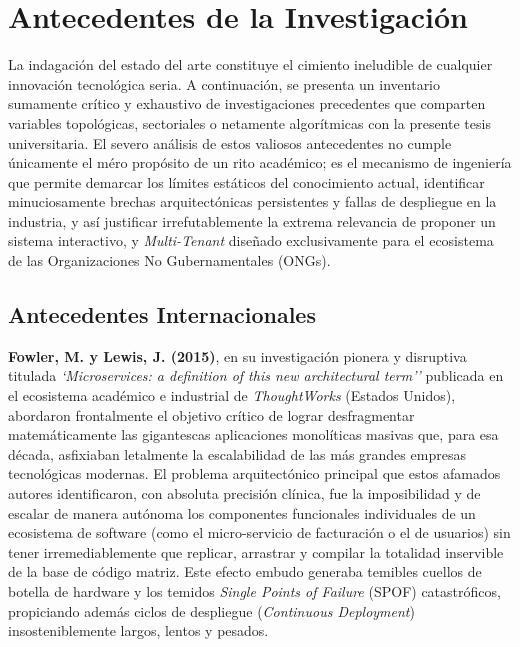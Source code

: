 \section{Antecedentes de la Investigación}
\label{sec:antecedentes}

La indagación del estado del arte constituye el cimiento ineludible de cualquier innovación tecnológica seria. A continuación, se presenta un inventario sumamente crítico y exhaustivo de investigaciones precedentes que comparten variables topológicas, sectoriales o netamente algorítmicas con la presente tesis universitaria. El severo análisis de estos valiosos antecedentes no cumple únicamente el méro propósito de un rito académico; es el mecanismo de ingeniería que permite demarcar los límites estáticos del conocimiento actual, identificar minuciosamente brechas arquitectónicas persistentes y fallas de despliegue en la industria, y así justificar irrefutablemente la extrema relevancia de proponer un sistema interactivo, y \textit{Multi-Tenant} diseñado exclusivamente para el ecosistema de las Organizaciones No Gubernamentales (ONGs).

\subsection{Antecedentes Internacionales}

\textbf{Fowler, M. y Lewis, J. (2015)}, en su investigación pionera y disruptiva titulada \textit{`Microservices: a definition of this new architectural term''} \citep{fowler2015} publicada en el ecosistema académico e industrial de \textit{ThoughtWorks} (Estados Unidos), abordaron frontalmente el objetivo crítico de lograr desfragmentar matemáticamente las gigantescas aplicaciones monolíticas masivas que, para esa década, asfixiaban letalmente la escalabilidad de las más grandes empresas tecnológicas modernas. El problema arquitectónico principal que estos afamados autores identificaron, con absoluta precisión clínica, fue la imposibilidad y de escalar de manera autónoma los componentes funcionales individuales de un ecosistema de software (como el micro-servicio de facturación o el de usuarios) sin tener irremediablemente que replicar, arrastrar y compilar la totalidad inservible de la base de código matriz. Este efecto embudo generaba temibles cuellos de botella de hardware y los temidos \textit{Single Points of Failure} (SPOF) catastróficos, propiciando además ciclos de despliegue (\textit{Continuous Deployment}) insosteniblemente largos, lentos y pesados. 

